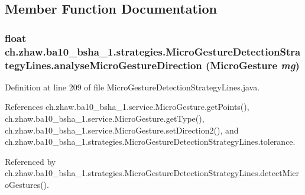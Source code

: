 \subsection{Member Function Documentation}
\hypertarget{classch_1_1zhaw_1_1ba10__bsha__1_1_1strategies_1_1MicroGestureDetectionStrategyLines_a3eed9607540b8b73f0dd0f77b841a9c7}{
\subsubsection[{analyseMicroGestureDirection}]{\setlength{\rightskip}{0pt plus 5cm}float ch.zhaw.ba10\_\-bsha\_\-1.strategies.MicroGestureDetectionStrategyLines.analyseMicroGestureDirection ({\bf MicroGesture} {\em mg})}}
\label{classch_1_1zhaw_1_1ba10__bsha__1_1_1strategies_1_1MicroGestureDetectionStrategyLines_a3eed9607540b8b73f0dd0f77b841a9c7}


Definition at line 209 of file MicroGestureDetectionStrategyLines.java.

References ch.zhaw.ba10\_\-bsha\_\-1.service.MicroGesture.getPoints(), ch.zhaw.ba10\_\-bsha\_\-1.service.MicroGesture.getType(), ch.zhaw.ba10\_\-bsha\_\-1.service.MicroGesture.setDirection2(), and ch.zhaw.ba10\_\-bsha\_\-1.strategies.MicroGestureDetectionStrategyLines.tolerance.

Referenced by ch.zhaw.ba10\_\-bsha\_\-1.strategies.MicroGestureDetectionStrategyLines.detectMicroGestures().

